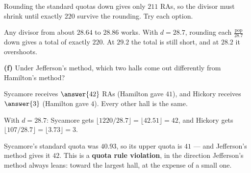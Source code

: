 \documentclass[12pt]{ximera}
\begin{document}
\begin{problem}
\begin{prompt}
\begin{hint}
Rounding the standard quotas down gives only $211$ RAs, so the divisor must shrink until
exactly $220$ survive the rounding. Try each option.
\end{hint}

\begin{feedback}
Any divisor from about $28.64$ to $28.86$ works. With $d=28.7$, rounding each
$\frac{\text{pop}}{28.7}$ down gives a total of exactly $220$. At $29.2$ the total is
still short, and at $28.2$ it overshoots.
\end{feedback}
\end{prompt}

\begin{prompt}
\textbf{(f)} Under Jefferson's method, which two halls come out differently from
Hamilton's method?

Sycamore receives $\answer{42}$ RAs (Hamilton gave $41$), and Hickory receives
$\answer{3}$ (Hamilton gave $4$). Every other hall is the same.

\begin{feedback}
With $d=28.7$: Sycamore gets $\lfloor 1220/28.7\rfloor=\lfloor 42.51\rfloor=42$, and
Hickory gets $\lfloor 107/28.7\rfloor=\lfloor 3.73\rfloor=3$.

Sycamore's standard quota was $40.93$, so its upper quota is $41$ --- and Jefferson's
method gives it $42$. This is a \textbf{quota rule violation}, in the direction
Jefferson's method always leans: toward the largest hall, at the expense of a small one.
\end{feedback}
\end{prompt}
\end{problem}
\end{document}
